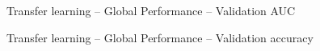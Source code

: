 \begin{figure}[!h]
\centering
\noindent
{}
\caption{Transfer learning -- Global Performance -- Validation AUC}
\label{fig:tl_global_validation_auc}
\end{figure}

\begin{figure}[!h]
\centering
\noindent
{}
\caption{Transfer learning -- Global Performance -- Validation accuracy}
\label{fig:tl_global_validation_accuracy}
\end{figure}

